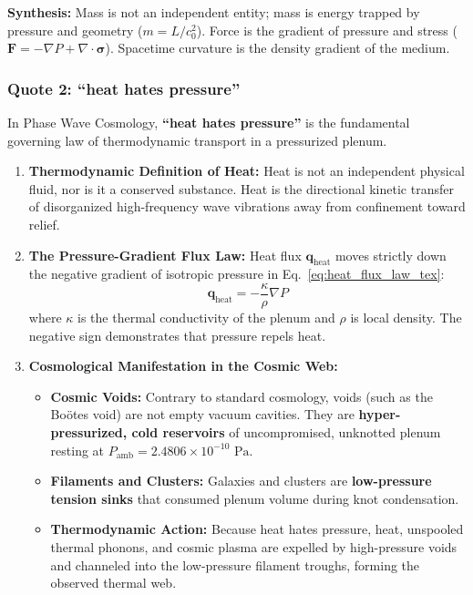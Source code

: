 \documentclass[11pt,a4paper]{article}
\begin{document}
\textbf{Synthesis:} Mass is not an independent entity; mass is energy trapped by pressure and geometry ($m = L/c_0^2$). Force is the gradient of pressure and stress ($\mathbf{F} = -\nabla P + \nabla \cdot \boldsymbol{\sigma}$). Spacetime curvature is the density gradient of the medium.

\subsubsection{Quote 2: ``heat hates pressure''}
\label{subsubsec:quote_hhp}

In Phase Wave Cosmology, \textbf{``heat hates pressure''} is the fundamental governing law of thermodynamic transport in a pressurized plenum.

\begin{enumerate}
    \item \textbf{Thermodynamic Definition of Heat:} Heat is not an independent physical fluid, nor is it a conserved substance. Heat is the directional kinetic transfer of disorganized high-frequency wave vibrations away from confinement toward relief.
    \item \textbf{The Pressure-Gradient Flux Law:} Heat flux $\mathbf{q}_{\text{heat}}$ moves strictly down the negative gradient of isotropic pressure in Eq.~\eqref{eq:heat_flux_law_tex}:
    \begin{equation}
    \mathbf{q}_{\text{heat}} = -\frac{\kappa}{\rho} \nabla P
    \label{eq:heat_flux_law_tex}
    \end{equation}
    where $\kappa$ is the thermal conductivity of the plenum and $\rho$ is local density. The negative sign demonstrates that pressure repels heat.
    \item \textbf{Cosmological Manifestation in the Cosmic Web:}
    \begin{itemize}
        \item \textbf{Cosmic Voids:} Contrary to standard cosmology, voids (such as the Bo\"otes void) are not empty vacuum cavities. They are \textbf{hyper-pressurized, cold reservoirs} of uncompromised, unknotted plenum resting at $P_{\text{amb}} = 2.4806 \times 10^{-10}\text{ Pa}$.
        \item \textbf{Filaments and Clusters:} Galaxies and clusters are \textbf{low-pressure tension sinks} that consumed plenum volume during knot condensation.
        \item \textbf{Thermodynamic Action:} Because heat hates pressure, heat, unspooled thermal phonons, and cosmic plasma are expelled by high-pressure voids and channeled into the low-pressure filament troughs, forming the observed thermal web.
    \end{itemize}
\end{enumerate}
\end{document}
